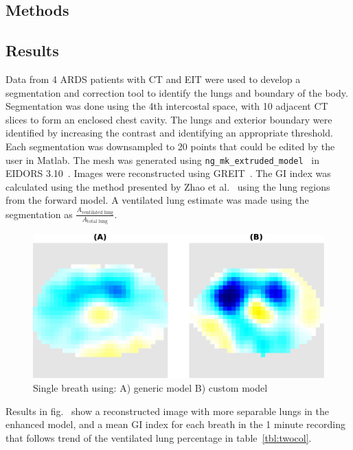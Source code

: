 \subsection{Methods}
\subsection{Results}
Data from 4 ARDS patients with CT
and EIT were used to develop a segmentation 
and correction tool to identify 
the lungs and boundary of the body.  
Segmentation was done using the 4th intercostal space, 
with 10 adjacent CT 
slices to form an enclosed chest cavity. 
The lungs
and exterior boundary were identified by increasing the contrast
and identifying an appropriate threshold.
Each segmentation was downsampled to
20 points that could be edited by the user in Matlab. The 
mesh was generated using 
\verb!ng_mk_extruded_model!~\cite{Grychtol2012} in EIDORS 
3.10~\cite{Adler2019}. Images were reconstructed 
using GREIT~\cite{Adler2009}. 
The GI index was calculated using the method
presented by Zhao et al.~\cite{Zhao2009} using the lung regions from the 
forward model. A ventilated lung estimate was made using the
segmentation as $\frac{A_{\text{ventilated lung}}}{A_{\text{total lung}}}$.

\begin{figure}
\centering
\includegraphics[width=\textwidth]{chapter5-CT_to_mesh/imgs/basic_vs_advanced_3_cropped.pdf}
\caption{\label{fig:ct_mesh_breath}%
Single breath using: A) generic model B) custom model
}
\end{figure}

Results in fig.~ show a reconstructed image 
with more separable lungs in the enhanced model, and a mean GI index for each breath in the 
1 minute 
recording that follows 
trend of the ventilated lung percentage in table~\ref{tbl:twocol}.

